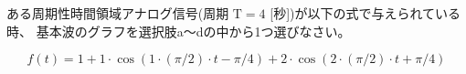 ある周期性時間領域アナログ信号(周期 $\textrm{T} = 4$ [秒])が以下の式で与えられている時、
基本波のグラフを選択肢a〜dの中から1つ選びなさい。

\[
f(t) = 
1
+ 1 \cdot \cos( 1 \cdot (\pi/2) \cdot t - \pi/4)
+ 2 \cdot \cos( 2 \cdot (\pi/2) \cdot t + \pi/4 )
\]
